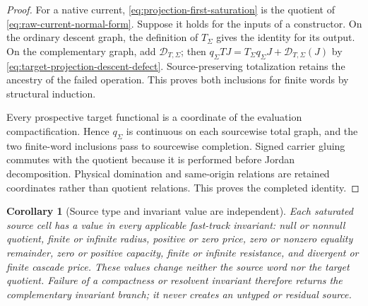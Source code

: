 \documentclass[11pt]{article}
\numberwithin{section}{part}
\theoremstyle{plain}
\newtheorem{corollary}[corollary]{Corollary}
\theoremstyle{definition}
\theoremstyle{remark}
\begin{document}
\begin{proof}
For a native current, \eqref{eq:projection-first-saturation} is the quotient
of \eqref{eq:raw-current-normal-form}.  Suppose it holds for the inputs of a
constructor.  On the ordinary descent graph, the definition of \(T_\Sigma\)
gives the identity for its output.  On the complementary graph, add
\(\mathcal D_{T,\Sigma}\); then
\(q_\Sigma TJ=T_\Sigma q_\Sigma J+\mathcal D_{T,\Sigma}(J)\) by
\eqref{eq:target-projection-descent-defect}.  Source-preserving totalization
retains the ancestry of the failed operation.  This proves both inclusions
for finite words by structural induction.

Every prospective target functional is a coordinate of the evaluation
compactification.  Hence \(q_\Sigma\) is continuous on each sourcewise total
graph, and the two finite-word inclusions pass to sourcewise completion.
Signed carrier gluing commutes with the quotient because it is performed
before Jordan decomposition.  Physical domination and same-origin relations
are retained coordinates rather than quotient relations.  This proves the
completed identity.
\end{proof}

\begin{corollary}[Source type and invariant value are independent]
\label{cor:source-type-bound-status}
Each saturated source cell has a value in every applicable fast-track
invariant: null or nonnull quotient, finite or infinite radius, positive or
zero price, zero or nonzero equality remainder, zero or positive capacity,
finite or infinite resistance, and divergent or finite cascade price.  These
values change neither the source word nor the target quotient.  Failure of a
compactness or resolvent invariant therefore returns the complementary
invariant branch; it never creates an untyped or residual source.
\end{corollary}
\end{document}
